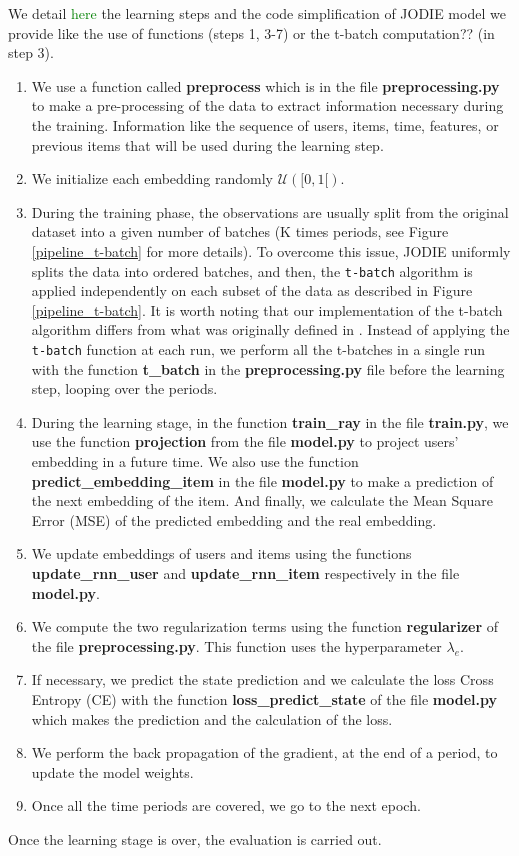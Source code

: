 We detail \textcolor{green}{here} the learning steps and the code simplification of JODIE model we provide like the use of functions (steps 1, 3-7) or the t-batch computation?? (in step 3). 
\begin{enumerate}
    \item We use a function called \textbf{preprocess} which is in the file \textbf{preprocessing.py} to make a pre-processing of the data to extract information necessary during the training. Information like the sequence of users, items, time, features, or previous items that will be used during the learning step.
    \item We initialize each embedding randomly $\mathcal{U}([0,1[)$.
    \item During the training phase, the observations are usually split from the original dataset into a given number of batches (K times periods, see Figure \ref{pipeline_t-batch} for more details). To overcome this issue, JODIE uniformly splits the data into ordered batches, and then, the \texttt{t-batch} algorithm is applied independently on each subset of the data as described in Figure \ref{pipeline_t-batch}.  It is worth noting that our implementation of the t-batch algorithm differs from what was originally defined in \cite{kumar18}. Instead of applying the \texttt{t-batch} function at each run, we perform all the t-batches in a single run with the  function \textbf{t\_batch} in the \textbf{preprocessing.py} file before the learning step, looping over the periods.
    \item During the learning stage, in the function \textbf{train\_ray} in the file \textbf{train.py}, we use the function \textbf{projection} from the file \textbf{model.py} to project users' embedding in a future time. We also use the function \textbf{predict\_embedding\_item} in the file \textbf{model.py} to make a prediction of the next embedding of the item. And finally, we calculate the Mean Square Error (MSE) of the predicted embedding and the real embedding.
    \item We update embeddings of users and items using the functions \textbf{update\_rnn\_user} and \textbf{update\_rnn\_item} respectively in the file \textbf{model.py}.
    \item We compute the two regularization terms using the function \textbf{regularizer} of the file \textbf{preprocessing.py}. This function uses the hyperparameter $\lambda_e$.
    \item If necessary, we predict the state prediction and we calculate the loss Cross Entropy (CE) with the function \textbf{loss\_predict\_state} of the file \textbf{model.py} which makes the prediction and the calculation of the loss.
    \item We perform the back propagation of the gradient, at the end of a period, to update the model weights.
    \item Once all the time periods are covered, we go to the next epoch.
\end{enumerate}
Once the learning stage is over, the evaluation is carried out.

